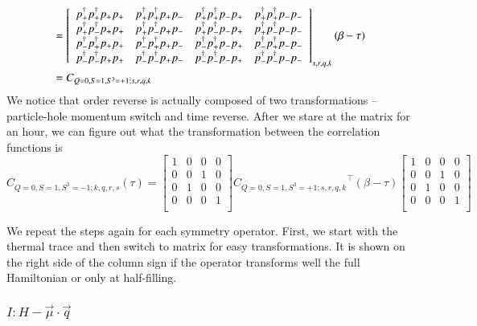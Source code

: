\begin{equation}
  \begin{aligned}
    &= \left[ 
    \begin{array}{cccc}
      p^\dagger_{+}p^\dagger_{+}p_{+}p_{+} & p^\dagger_{+}p^\dagger_{+}p_{+}p_{-} & p^\dagger_{+}p^\dagger_{+}p_{-}p_{+} & p^\dagger_{+}p^\dagger_{+}p_{-}p_{-} \\
      p^\dagger_{+}p^\dagger_{-}p_{+}p_{+} & p^\dagger_{+}p^\dagger_{-}p_{+}p_{-} & p^\dagger_{+}p^\dagger_{-}p_{-}p_{+} & p^\dagger_{+}p^\dagger_{-}p_{-}p_{-} \\
      p^\dagger_{-}p^\dagger_{+}p_{+}p_{+} & p^\dagger_{-}p^\dagger_{+}p_{+}p_{-} & p^\dagger_{-}p^\dagger_{+}p_{-}p_{+} & p^\dagger_{-}p^\dagger_{+}p_{-}p_{-} \\
      p^\dagger_{-}p^\dagger_{-}p_{+}p_{+} & p^\dagger_{-}p^\dagger_{-}p_{+}p_{-} & p^\dagger_{-}p^\dagger_{-}p_{-}p_{+} & p^\dagger_{-}p^\dagger_{-}p_{-}p_{-} \\
    \end{array} \right]_{s,r,q,k} (\beta-\tau) \\
    &= C_{Q=0,S=1,S^3=+1;s,r,q,k}
  \end{aligned}
\end{equation}
We notice that order reverse is actually composed of two transformations -- particle-hole momentum switch and time reverse. After we stare at the matrix for an hour, we can figure out what the transformation between the correlation functions is
\begin{equation}
  C_{Q=0,S=1,S^3=-1;k,q,r,s} (\tau) =
  \left[ {\begin{array}{cccc}
    1 & 0 & 0 & 0 \\
    0 & 0 & 1 & 0 \\
    0 & 1 & 0 & 0 \\
    0 & 0 & 0 & 1 \\
  \end{array} } \right]
  {C_{Q=0,S=1,S^3=+1;s,r,q,k}}^\top (\beta-\tau)
  \left[ {\begin{array}{cccc}
    1 & 0 & 0 & 0 \\
    0 & 0 & 1 & 0 \\
    0 & 1 & 0 & 0 \\
    0 & 0 & 0 & 1 \\
  \end{array} } \right]
\end{equation}

We repeat the steps again for each symmetry operator. First, we start with the thermal trace and then switch to matrix for easy transformations. It is shown on the right side of the column sign if the operator transforms well the full Hamiltonian or only at half-filling.\\

\subsubsection{\underline{$I : H - \vec{\mu}\cdot\vec{q}$}}


